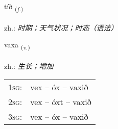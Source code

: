 \documentclass[frontgrid, backgrid]{flacards}\usepackage[]{graphicx}\usepackage[]{xcolor}
\begin{document}
\renewcommand{\flhead}{\vskip5pt \fboxsep=0pt {\small\bfseries\footnotesize Nafnorð | 名词}}
\renewcommand{\fcfoot}{\vskip5pt \fboxsep=0pt \hspace{2pt}{\small\bfseries\footnotesize 1K}}

\renewcommand{\blhead}{\vskip5pt {\small\bfseries\footnotesize Nafnorð | 名词 }}
\renewcommand{\bcfoot}{\vskip5pt \hspace{2pt}{\small\bfseries\footnotesize 1K}}


{tíð \small{\textsubscript{(\textit{f.})}} \\[1ex] %
\textphonetic{[tʰiːð]} \\
zh.: \emph{时期；天气状况；时态（语法）} \\  [2ex]
\renewcommand*{\arraystretch}{0.8}
}

\renewcommand{\flhead}{\vskip5pt \fboxsep=0pt {\small\bfseries\footnotesize Sagnorð | 动词}}
\renewcommand{\fcfoot}{\vskip5pt \fboxsep=0pt \hspace{2pt}{\small\bfseries\footnotesize 1K}}

\renewcommand{\blhead}{\vskip5pt {\small\bfseries\footnotesize Sagnorð | 动词 }}
\renewcommand{\bcfoot}{\vskip5pt \hspace{2pt}{\small\bfseries\footnotesize 1K}}


{vaxa \small{\textsubscript{(\textit{v.})}} \\[1ex] %
\textphonetic{[vaksa]} \\
zh.: \emph{生长；增加} \\  [2ex]
\renewcommand*{\arraystretch}{0.8}
\begin{tabular}{p{1cm}l}
\textsc{1sg}: & vex -- óx -- vaxið \\ 
\textsc{2sg}: & vex -- óxt -- vaxið \\ 
\textsc{3sg}: & vex -- óx -- vaxið \\ 
\end{tabular}
}
\end{document}
